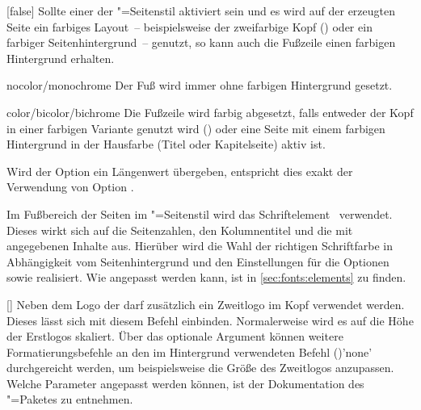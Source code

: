 \begin{Declaration*}{}
\begin{Declaration*}{}
\begin{Declaration*}{}
\begin{Declaration}[%
  v2.03!\Option{cdfoot=color}:farbiger Hintergrund der Fußzeile;%
  v2.03!\Option{cdfoot=\PValueName{Höhe}};%
]{}[false]
Sollte einer der "=Seitenstil aktiviert sein und es wird 
auf der erzeugten Seite ein farbiges Layout~--  beispielsweise der zweifarbige 
Kopf () oder ein farbiger Seitenhintergrund~-- genutzt, 
so kann auch die Fußzeile einen farbigen Hintergrund erhalten.
%
\begin{values}{}
\item[nocolor/monochrome]
  Der Fuß wird immer ohne farbigen Hintergrund gesetzt.
\item[color/bicolor/bichrome]
  Die Fußzeile wird farbig abgesetzt, falls entweder der Kopf in einer farbigen
  Variante genutzt wird () oder eine Seite mit einem 
  farbigen Hintergrund in der Hausfarbe (Titel oder Kapitelseite) aktiv ist.
\item[\PValueName{Höhe}]
  Wird der Option ein Längenwert übergeben, entspricht dies exakt der 
  Verwendung von Option .
\end{values}
\end{Declaration}

\begin{Declaration}[v2.04]{}
\printdeclarationlist%
%
%
Im Fußbereich der Seiten im "=Seitenstil wird das 
Schriftelement~ verwendet. Dieses wirkt sich auf die 
Seitenzahlen, den Kolumnentitel und die mit  angegebenen 
Inhalte aus. Hierüber wird die Wahl der richtigen Schriftfarbe in Abhängigkeit 
vom Seitenhintergrund und den Einstellungen für die Optionen  
sowie  realisiert. Wie  angepasst werden 
kann, ist in \autoref{sec:fonts:elements} zu finden.
\end{Declaration}

\begin{Declaration}{[\LParameter{}]}
\printdeclarationlist%
%
%
%
%
Neben dem Logo der \TnUD darf zusätzlich ein Zweitlogo im Kopf verwendet 
werden. Dieses lässt sich mit diesem Befehl einbinden. Normalerweise wird es 
auf die Höhe der Erstlogos skaliert. Über das optionale Argument können weitere 
Formatierungsbefehle an den im Hintergrund verwendeten Befehl 
()'none' durchgereicht werden, um 
beispielsweise die Größe des Zweitlogos anzupassen. Welche Parameter angepasst 
werden können, ist der Dokumentation des "=Paketes zu 
entnehmen.


\end{Declaration}
\end{Declaration*}
\end{Declaration*}
\end{Declaration*}
